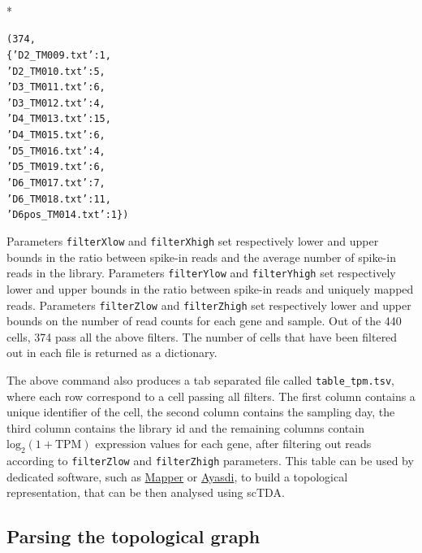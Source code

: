 \documentclass[letterpaper,10pt,english]{/usr/share/sphinx/texinputs/sphinxhowto}
\def\smaller{\fontsize{9.5pt}{9.5pt}\selectfont}
\newenvironment{InvisibleVerbatim}
        {\begin{mdframed}[leftmargin=0.1\linewidth,innerleftmargin=3pt,innerrightmargin=3pt, userdefinedwidth=1\linewidth, linewidth=0pt, linecolor=white, usetwoside=false]}
        {\end{mdframed}}
\begin{document}
        

            
                \makebox[0.1\linewidth]{\smaller\hfill\tt\color{nbframe-out-prompt}Out\hspace{4pt}{[}4{]}:\hspace{4pt}}\\*
                \vspace{-1.9\baselineskip}\begin{InvisibleVerbatim}
\begin{alltt}(374,
 \{'D2\_TM009.txt': 1,
  'D2\_TM010.txt': 5,
  'D3\_TM011.txt': 6,
  'D3\_TM012.txt': 4,
  'D4\_TM013.txt': 15,
  'D4\_TM015.txt': 6,
  'D5\_TM016.txt': 4,
  'D5\_TM019.txt': 6,
  'D6\_TM017.txt': 7,
  'D6\_TM018.txt': 11,
  'D6pos\_TM014.txt': 1\})\end{alltt}

            \end{InvisibleVerbatim}
            
        
    
Parameters \texttt{filterXlow} and \texttt{filterXhigh} set respectively lower and upper
bounds in the ratio between spike-in reads and the average number of
spike-in reads in the library. Parameters \texttt{filterYlow} and \texttt{filterYhigh} set
respectively lower and upper bounds in the ratio between spike-in reads
and uniquely mapped reads. Parameters \texttt{filterZlow} and \texttt{filterZhigh} set
respectively lower and upper bounds on the number of read counts for
each gene and sample. Out of the 440 cells, 374 pass all the above
filters. The number of cells that have been filtered out in each file is
returned as a dictionary.

The above command also produces a tab separated file called
\texttt{table\_tpm.tsv}, where each row correspond to a cell passing all filters.
The first column contains a unique identifier of the cell, the second
column contains the sampling day, the third column contains the library
id and the remaining columns contain $\textrm{log}_2(1+\textrm{TPM})$ expression values for
each gene, after filtering out reads according to \texttt{filterZlow} and
\texttt{filterZhigh} parameters. This table can be used by dedicated software,
such as \href{http://danifold.net/mapper/}{Mapper} or \href{http://www.ayasdi.com/}{Ayasdi}, to build a topological representation, that
can be then analysed using scTDA.

\subsection{Parsing the topological graph}
\end{document}
